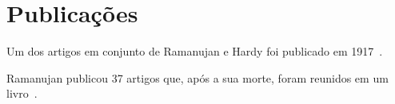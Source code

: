 \documentclass[12pt, a4paper]{article}
\begin{document}
\section{Publicações}\label{sec:publicacoes}

\noindent
Um dos artigos em conjunto de Ramanujan e Hardy foi publicado em 
1917~\cite{1917-hardy-ramanujan}.

Ramanujan publicou 37 artigos que, após a sua morte, foram reunidos em um
livro~\cite{2000-aiyangar-etal}.


\end{document}
